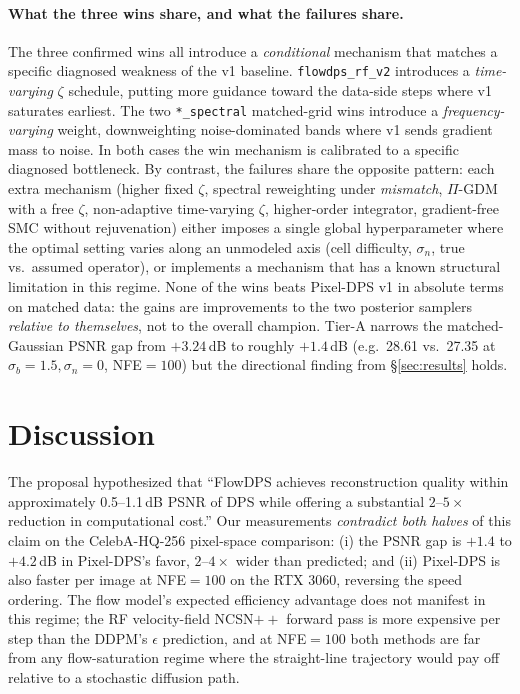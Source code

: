 \documentclass{article}
\begin{document}
\paragraph{What the three wins share, and what the failures share.}
The three confirmed wins all introduce a \emph{conditional} mechanism
that matches a specific diagnosed weakness of the v1 baseline.
\texttt{flowdps\_rf\_v2} introduces a \emph{time-varying} $\zeta$
schedule, putting more guidance toward the data-side steps where
v1 saturates earliest. The two \texttt{*\_spectral} matched-grid
wins introduce a \emph{frequency-varying} weight, downweighting
noise-dominated bands where v1 sends gradient mass to noise. In
both cases the win mechanism is calibrated to a specific
diagnosed bottleneck. By contrast, the failures share the opposite
pattern: each extra mechanism (higher fixed $\zeta$, spectral
reweighting under \emph{mismatch}, $\Pi$-GDM with a free $\zeta$,
non-adaptive time-varying $\zeta$, higher-order integrator,
gradient-free SMC without rejuvenation) either imposes a single
global hyperparameter where the optimal setting varies along an
unmodeled axis (cell difficulty, $\sigma_n$, true vs.\ assumed
operator), or implements a mechanism that has a known structural
limitation in this regime. None of the wins beats Pixel-DPS v1 in
absolute terms on matched data: the gains are improvements to the
two posterior samplers \emph{relative to themselves}, not to the
overall champion. Tier-A narrows the matched-Gaussian PSNR gap from
$+3.24$\,dB to roughly $+1.4$\,dB (e.g.\ 28.61 vs.\ 27.35 at
$\sigma_b{=}1.5, \sigma_n{=}0$, NFE${=}100$) but the directional
finding from \S\ref{sec:results} holds.

\section{Discussion}\label{sec:discussion}

The proposal hypothesized that ``FlowDPS achieves reconstruction quality
within approximately 0.5--1.1\,dB PSNR of DPS while offering a substantial
$2$--$5\times$ reduction in computational cost.'' Our measurements
\emph{contradict both halves} of this claim on the CelebA-HQ-256
pixel-space comparison: (i) the PSNR gap is $+1.4$ to $+4.2$\,dB in
Pixel-DPS's favor, $2$--$4\times$ wider than predicted; and (ii)
Pixel-DPS is also faster per image at NFE${=}100$ on the RTX 3060,
reversing the speed ordering. The flow model's expected efficiency
advantage does not manifest in this regime; the RF velocity-field
NCSN$++$ forward pass is more expensive per step than the DDPM's
$\epsilon$ prediction, and at NFE${=}100$ both methods are far from any
flow-saturation regime where the straight-line trajectory would pay off
relative to a stochastic diffusion path.
\end{document}

